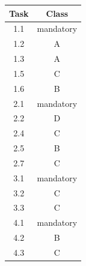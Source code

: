 \documentclass[%
 aip,
 jmp,%
 amsmath,amssymb,
 reprint,%
]{revtex4-1}
\begin{document}
\begin{center}
	\begin{tabular}{|c|c|} 
		\hline
		Task & Class\\ [0.5ex] 
		\hline\hline
		1.1 & mandatory\\ 
		\hline
		1.2 & A\\
		\hline
		1.3 & A\\ 
		\hline
		1.5 & C\\
		\hline
		1.6 & B\\ 
		\hline
		2.1 & mandatory\\
		\hline
		2.2 & D\\ 
		\hline
		2.4 & C\\
		\hline
		2.5 & B\\ 
		\hline
		2.7 & C\\
		\hline
		3.1 & mandatory\\ 
		\hline
		3.2 & C\\
		\hline
		3.3 & C\\
		\hline
		4.1 & mandatory\\ 
		\hline
		4.2 & B\\
		\hline
		4.3 & C \\
		\hline
	\end{tabular}	
\end{center}
\end{document}
